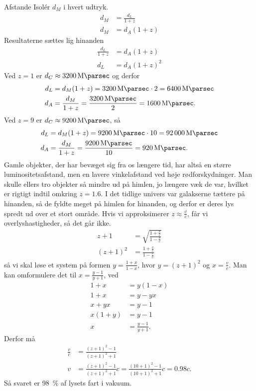 \documentclass[crop=false, class=memoir]{standalone}
\begin{document}
\begin{opgave}{Afstande}
	\opg Isolér $d_M$ i hvert udtryk.
	\begin{align}
		d_M &= \frac{d_L}{1+z}\\
		d_M &= d_A(1+z)
	\end{align}
	Resultaterne sættes lig hinanden
		\begin{align}
		\frac{d_L}{1+z} &= d_A(1+z)\\
		d_L &= d_A (1+z)^2
		\end{align}
	\opg Ved $z = 1$ er $d_C \approx \SI{3200}{\mega\parsec}$ og derfor
	\begin{align}
		d_L &= d_M (1+z)= \SI{3200}{\mega\parsec} \cdot 2 = \SI{6400}{\mega\parsec}\\
		d_A &= \frac{d_M}{1+z}= \frac{\SI{3200}{\mega\parsec}}{2} = \SI{1600}{\mega\parsec}.
	\end{align}
	Ved $z = 9$ er $d_C \approx \SI{9200}{\mega\parsec}$, så
	\begin{align}
		d_L &= d_M(1+z)= \SI{9200}{\mega\parsec} \cdot 10 = \SI{92000}{\mega\parsec}\\
		d_A &= \frac{d_M}{1+z}= \frac{\SI{9200}{\mega\parsec}}{10} = \SI{920}{\mega\parsec}.
	\end{align}
	Gamle objekter, der har bevæget sig fra os længere tid, har altså en større luminositetsafstand, men en lavere vinkelafstand ved høje rødforskydninger. Man skulle ellers tro objekter så mindre ud på himlen, jo længere væk de var, hvilket er rigtigt indtil omkring $z = \num{1,6}$. I det tidlige univers var galakserne tættere på hinanden, så de fyldte meget på himlen for hinanden, og derfor er deres lys spredt ud over et stort område.
	\opg
	Hvis vi approksimerer $z \approx \frac{v}{c}$, får vi overlyshastigheder, så det går ikke.
	\begin{align}
    	z+1 &= \sqrt{\frac{1+\frac{v}{c}}{1-\frac{v}{c}}}\\
    	(z+1)^2 &= \frac{1+\frac{v}{c}}{1-\frac{v}{c}}
	\end{align}
	så vi skal løse et system på formen $y = \frac{1+x}{1-x}$, hvor $y = (z+1)^2$ og $x = \frac{v}{c}$. Man kan omformulere det til $x = \frac{y-1}{y+1}$, ved
	\begin{align}
	    1+x &= y(1-x)\\
	    1+x &= y-yx \\
	    x+yx &= y-1 \\
	    x(1+y) &= y-1 \\
	    x &= \frac{y-1}{y+1}.
	\end{align}
    Derfor må
	\begin{align}
    	\frac{v}{c}&=\frac{(z+1)^2-1}{(z+1)^2+1}\\
    	v&=\frac{(z+1)^2-1}{(z+1)^2+1} c = \frac{(10+1)^2-1}{(10+1)^2+1} c = \num{0.98} c. %
	\end{align}
	Så svaret er \SI{98}{\percent} af lysets fart i vakuum.
\end{opgave}
\end{document}
